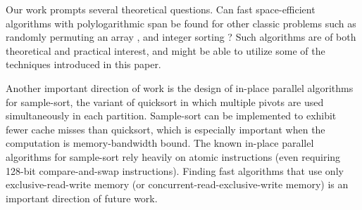 \documentclass[a4paper,UKenglish,cleveref, autoref, thm-restate]{lipics-v2019}
\newcommand{\defn}[1]{{\textit{\textbf{\boldmath #1}}}}
\begin{document}
Our work prompts several theoretical questions. Can fast
space-efficient algorithms with polylogarithmic span be found for
other classic problems such as randomly permuting an array
\cite{Anderson90, AlonsoSc96, ShunGu15}, and integer sorting
\cite{Rajasekaran92, HanHe12, AlbersHa97, Han01, GerbessiotisSi04}?
Such algorithms are of both theoretical and practical interest, and
might be able to utilize some of the techniques introduced in this
paper.

Another important direction of work is the design of in-place parallel
algorithms for sample-sort, the variant of quicksort in which multiple
pivots are used simultaneously in each partition. Sample-sort can be
implemented to exhibit fewer cache misses than quicksort, which is
especially important when the computation is memory-bandwidth
bound. The known in-place parallel algorithms for sample-sort rely
heavily on atomic instructions \cite{AxtmannWi17} (even requiring
128-bit compare-and-swap instructions). Finding fast algorithms that
use only exclusive-read-write memory (or
concurrent-read-exclusive-write memory) is an important direction of
future work.

\clearpage

\appendix




\end{document}
